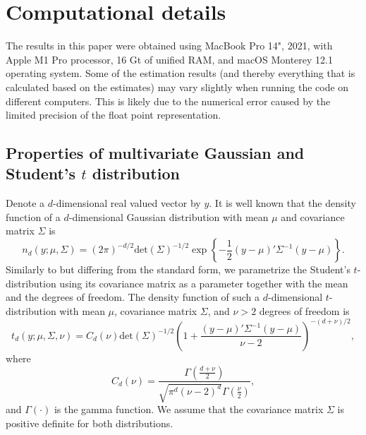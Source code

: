 \documentclass[nojss]{jss}
\begin{document}
\section*{Computational details}
The results in this paper were obtained using MacBook Pro 14", 2021, with Apple M1 Pro processor, 16 Gt of unified RAM, and macOS Monterey 12.1 operating system. Some of the estimation results (and thereby everything that is calculated based on the estimates) may vary slightly when running the code on different computers. This is likely due to the numerical error caused by the limited precision of the float point representation.

\pagebreak


\newpage

\begin{appendix}
\section{Properties of multivariate Gaussian and Student's $t$ distribution}\label{ap:propt}
Denote a $d$-dimensional real valued vector by $y$.  It is well known that the density function of a $d$-dimensional Gaussian distribution with mean $\mu$ and covariance matrix $\Sigma$ is
\begin{equation}
n_d(y;\mu,\Sigma) = (2\pi)^{-d/2}\text{det}(\Sigma)^{-1/2}\exp\left\lbrace -\frac{1}{2}(y -\mu)'\Sigma^{-1}(y - \mu) \right\rbrace .
\end{equation}
Similarly to \cite{Meitz+Preve+Saikkonen:2021} but differing from the standard form, we parametrize the Student's $t$-distribution using its covariance matrix as a parameter together with the mean and the degrees of freedom. The density function of such a $d$-dimensional $t$-distribution with mean $\mu$, covariance matrix $\Sigma$, and $\nu>2$ degrees of freedom is
\begin{equation}
t_d(y;\mu,\Sigma,\nu)=C_d(\nu)\text{det}(\Sigma)^{-1/2}\left(1+\frac{(y -\mu)'\Sigma^{-1}(y - \mu)}{\nu-2}\right)^{-(d+\nu)/2},
\end{equation}
where
\begin{equation}
C_d(\nu)=\frac{\Gamma\left(\frac{d+\nu}{2}\right)}{\sqrt{\pi^d(\nu-2)^d}\Gamma\left(\frac{\nu}{2}\right)},
\end{equation}
and $\Gamma\left(\cdot\right)$ is the gamma function.  We assume that the covariance matrix $\Sigma$ is positive definite for both distributions.


\end{appendix}
\end{document}
